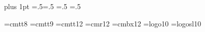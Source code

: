 %


\pdffalse \dvipdffalse        %
\parskip=0pt plus 1pt
\parindent=18pt
\abovedisplayskip=.5\abovedisplayskip  \belowdisplayskip=.5\belowdisplayskip
\abovedisplayshortskip=.5\abovedisplayshortskip
\belowdisplayshortskip=.5\belowdisplayshortskip

\font\eighttt=cmtt8
\font\ninett=cmtt9
\font\twelvett=cmtt12
\hyphenchar{} \hyphenchar{} \hyphenchar{}
\font\authorfont=cmr12
\font\sectionfont=cmbx12
\font\tenlogo=logo10 \font\tensllogo=logosl10
\def\MF{{\tenlogo META}\-{\tenlogo FONT}}
\def\slMF{{\tensllogo META}\-{\tensllogo FONT}}

\def\cw#1{{\tt #1}}
\def\bs{\char92 }                              %
\def\rn#1{$\langle\,${\it #1\/}$\,\rangle$}    %

\def\chapter#1{\penalty-500\bigskip
  \centerline{\sectionfont\def\.##1{{\twelvett##1}}#1}\nobreak\vskip 6pt}
\def\section#1{\medskip\noindent{\bf #1.}\enspace\ignorespaces}

\def\bull{\smallskip\item{$\bullet$}}

